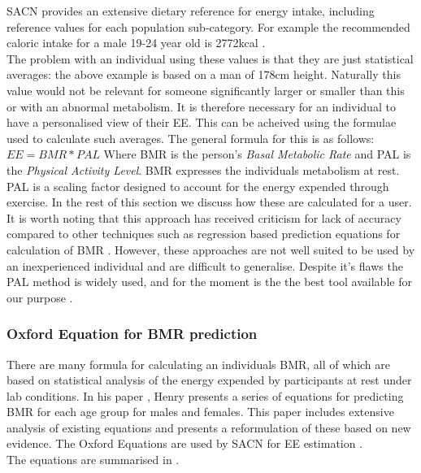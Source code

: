 SACN provides an extensive dietary reference for energy intake, including reference values for each population sub-category. For example the recommended caloric intake for a male 19-24 year old is 2772kcal \cite[p.~85, table~16]{SACNDietaryReference}.\\

The problem with an individual using these values is that they are just statistical averages: the above example is based on a man of 178cm height. Naturally this value would not be relevant for someone significantly larger or smaller than this or with an abnormal metabolism. It is therefore necessary for an individual to have a personalised view of their EE. This can be acheived using the formulae used to calculate such averages. The general formula for this is as follows:
$EE = BMR * PAL$
Where BMR is the person's \emph{Basal Metabolic Rate} and PAL is the \emph{Physical Activity Level}. BMR expresses the individuals metabolism at rest. PAL is a scaling factor designed to account for the energy expended through exercise. In the rest of this section we discuss how these are calculated for a user.\\
It is worth noting that this approach has received criticism for lack of accuracy compared to other techniques such as regression based prediction equations for calculation of BMR \cite{Goran2005}. However, these approaches are not well suited to be used by an inexperienced individual and are difficult to generalise. Despite it's flaws the PAL method is widely used, and for the moment is the the best tool available for our purpose \cite[pg.~110]{SACNDietaryReference}.\\

\subsubsection{Oxford Equation for BMR prediction}
There are many formula for calculating an individuals BMR, all of which are based on statistical analysis of the energy expended by participants at rest under lab conditions. In his paper \cite{OxfordEquations}, Henry presents a series of equations for predicting BMR for each age group for males and females. This paper includes extensive analysis of existing equations and presents a reformulation of these based on new evidence. The Oxford Equations are used by SACN for EE estimation \cite[p.~104]{SACNDietaryReference}.\\
The equations are summarised in \cite[Table.~15]{OxfordEquations}.

